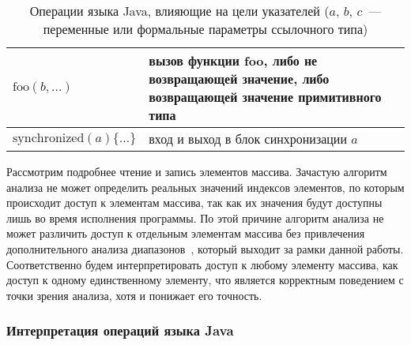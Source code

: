 \documentclass[14pt,titlepage]{extarticle}
\newcommand{\eng}[1]{{\English#1}}
\newcommand{\java}{\eng{Java}\xspace}
\begin{document}
\begin{table}
\begin{tabular}{|l|p{}|}
          $\textrm{foo}(b, \ldots)$
          & вызов функции foo, либо не возвращающей значение, либо возвращающей
            значение примитивного типа \\ \hline

          $\textrm{synchronized}(a) \{\ldots\}$
          & вход и выход в блок синхронизации $a$ \\ \hline
        \end{tabular}
        \caption{Операции языка \java, влияющие на цели указателей
                 ($a$, $b$, $c$~--- переменные или формальные параметры
                 ссылочного типа)}
        \label{tabular:operations}
      \end{table}

      Рассмотрим подробнее чтение и запись элементов массива. Зачастую
      алгоритм анализа не может определить реальных значений индексов
      элементов, по которым происходит доступ к элементам массива, так как их
      значения будут доступны лишь во время исполнения программы.
      По этой причине алгоритм анализа не может различить доступ к отдельным
      элементам массива без привлечения дополнительного анализа
      диапазонов~\cite[раздел~8.12]{muchnick}, который выходит за рамки данной
      работы.
      Соответственно будем интерпретировать доступ к любому элементу массива,
      как доступ к одному единственному элементу, что является корректным
      поведением с точки зрения анализа, хотя и понижает его точность.

      \subsubsection{\texorpdfstring{Интерпретация операций языка \java}
                                    {Интерпретация операций языка Java}}
\end{document}
